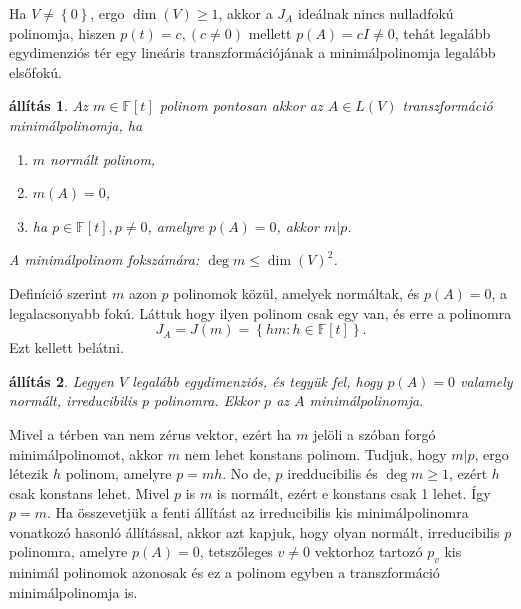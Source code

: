 \documentclass[a4paper, showtrims]{memoir}
\makeatletter
\renewenvironment{proof}[1][\proofname]
    {\par\pushQED{\qed}%
    \normalfont \topsep6\p@\@plus6\p@\relax
    \trivlist
    \item[\hskip\labelsep
        \itshape
    #1\@addpunct{:}]\ignorespaces}
    {\popQED\endtrivlist\@endpefalse}
\theoremstyle{plain}
\newtheorem{proposition}{állítás}[chapter]
\theoremstyle{remark}
\theoremstyle{definition}
\makeatother
\begin{document}
Ha $V\neq\left\{ 0 \right\}$, ergo $\dim(V)\geq 1$,
akkor a $J_{A}$ ideálnak nincs nulladfokú polinomja,
hiszen $p(t)=c, (c\neq 0)$ mellett
$p\left( A \right)=cI\neq 0$,
tehát legalább egydimenziós tér egy lineáris transzformációjának a minimálpolinomja legalább elsőfokú.
\begin{proposition}
	Az  $m\in\mathbb{F}\left[ t \right]$ polinom pontosan akkor
	az $A\in L\left( V \right)$ transzformáció minimálpolinomja,
	ha
	\begin{enumerate}
		\item $m$ normált polinom,
		\item $m\left( A \right)=0$,
		\item ha $p\in\mathbb{F}\left[ t \right], p\neq 0$, amelyre
		      $p\left( A \right)=0$, akkor $m|p$.
	\end{enumerate}
	A minimálpolinom fokszámára:
	$\deg m\leq\dim(V)^2$.
\end{proposition}
\begin{proof}
	Definíció szerint $m$ azon $p$ polinomok közül,
	amelyek normáltak, és $p\left( A \right)=0$, a legalacsonyabb fokú.
	Láttuk hogy ilyen polinom csak egy van, és erre a polinomra
	\[
		J_{A}=J\left( m \right)=\left\{ hm:h\in\mathbb{F}\left[ t \right] \right\}.
	\]
	Ezt kellett belátni.
\end{proof}
\begin{proposition}
	Legyen $V$ legalább egydimenziós,
	és tegyük fel, hogy $p\left( A \right)=0$ valamely normált,
	irreducibilis $p$ polinomra.
	Ekkor $p$ az $A$ minimálpolinomja.
\end{proposition}
\begin{proof}
    Mivel a térben van nem zérus vektor, ezért ha $m$ jelöli a szóban forgó 
    minimálpolinomot, akkor $m$ nem lehet konstans polinom.
    Tudjuk, hogy $m|p$, ergo létezik $h$ polinom, amelyre $p=mh$.
    No de, $p$ iredducibilis és $\deg m\geq 1$, ezért $h$ csak konstans lehet.
    Mivel $p$ is $m$ is normált, ezért e konstans csak 1 lehet.
    Így $p=m$.
\end{proof}
Ha összevetjük a fenti állítást az irreducibilis kis minimálpolinomra vonatkozó hasonló állítással,
akkor azt kapjuk, hogy olyan normált, irreducibilis $p$ polinomra, 
amelyre $p\left( A \right)=0$, tetszőleges $v\neq 0$ vektorhoz tartozó $p_v$ kis minimál polinomok azonosak
és ez a polinom egyben a transzformáció minimálpolinomja is.
\end{document}
